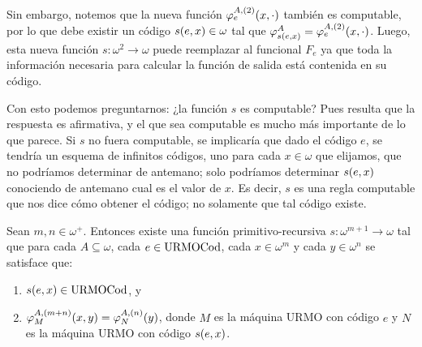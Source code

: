 \begin{agregado}
\begin{agregado}
Sin embargo, notemos que la nueva función $\varphi_{e}^{A, (2)}\pa*{x,\cdot}$ también es computable, por lo que debe existir un código $s\pa*{e, x}\in\omega$ tal que $\varphi_{s\pa*{e, x}}^{A} =\varphi_{e}^{A, (2)}\pa*{x,\cdot}$. Luego, esta nueva función $s:\omega^{2}\to\omega$ puede reemplazar al funcional $F_{e}$ ya que toda la información necesaria para calcular la función de salida está contenida en su código.

Con esto podemos preguntarnos: ¿la función $s$ es computable? Pues resulta que la respuesta es afirmativa, y el que sea computable es mucho más importante de lo que parece. Si $s$ no fuera computable, se implicaría que dado el código $e$, se tendría un esquema de infinitos códigos, uno para cada $x\in\omega$ que elijamos, que no podríamos determinar de antemano; solo podríamos determinar $s\pa*{e, x}$ conociendo de antemano cual es el valor de $x$. Es decir, $s$ es una regla computable que nos dice cómo obtener el código; no solamente que tal código existe.

\begin{theorem}[Teorema s-m-n]
	\label{theo: smn}
	Sean $m, n\in\omega^{+}$. Entonces existe una función primitivo-recursiva $s:\omega^{m + 1}\to\omega$ tal que para cada $A\subseteq\omega$, cada $e\in\mathrm{URMOCod}$, cada $x\in\omega^{m}$ y cada $y\in\omega^{n}$ se satisface que:
	\begin{enumerate}
		\item $s\pa*{e, x}\in\URMOCODIGO$, y
		\item $\varphi_{M}^{A, (m + n)}\pa*{x, y} =\varphi_{N}^{A, (n)}\pa*{y}$, donde $M$ es la máquina URMO con código $e$ y $N$ es la máquina URMO con código $s\pa*{e, x}$.
	\end{enumerate}
\end{theorem}


\end{agregado}
\end{agregado}
